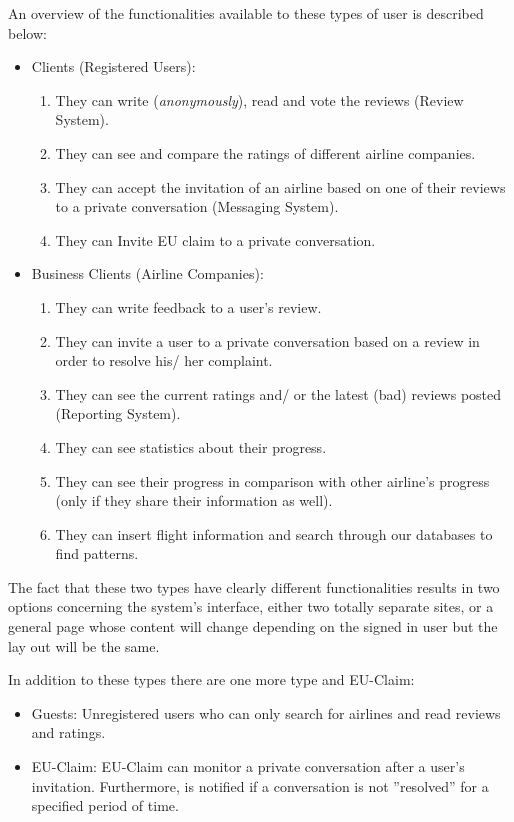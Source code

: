 An overview of the functionalities available to these types of user is described below: 
\begin{itemize}
\item Clients (Registered Users):
	\begin{enumerate}
		\item They can write ({\em anonymously}), read and vote the reviews (Review System).
        \item They can see and compare the ratings of different airline companies.
        \item They can accept the invitation of an airline based on one of their reviews to a private conversation (Messaging System). 
		\item They can Invite EU claim to a private conversation.
	\end{enumerate}
\item Business Clients (Airline Companies):
	\begin{enumerate}
		\item They can write feedback to a user's review.
		\item They can invite a user to a private conversation based on a review in order to resolve his/ her complaint.
		\item They can see the current ratings and/ or the latest (bad) reviews posted (Reporting System).
		\item They can see statistics about their progress.
		\item They can see their progress in comparison with other airline's progress (only if they share their information as well).
		\item They can insert flight information and search through our databases to find patterns.
	\end{enumerate}
\end{itemize}

The fact that these two types have clearly different functionalities results in two options concerning the system's interface, either two totally separate sites, or a general page 
whose content will change depending on the signed in user but the lay out will be the same.

In addition to these types there are one more type and EU-Claim:
\begin{itemize}
 \item Guests: Unregistered users who can only search for airlines and read reviews and ratings.
 \item EU-Claim: EU-Claim can monitor a private conversation after a user's invitation. Furthermore, is notified if a conversation is not ''resolved'' for a specified period of time.
\end{itemize}


